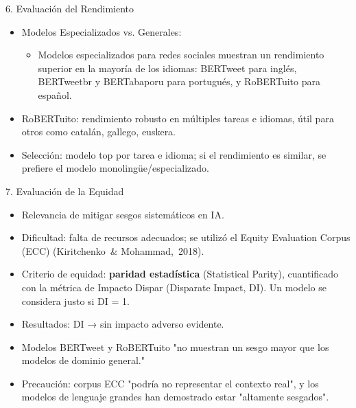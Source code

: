 \documentclass{beamer}
\begin{document}
\begin{frame}{6. Evaluación del Rendimiento}
  \begin{itemize}
    \item Modelos Especializados vs. Generales: 
    \begin{itemize} 
        \item Modelos especializados para redes sociales muestran un rendimiento superior en la mayoría de los idiomas: BERTweet para inglés, BERTweetbr y BERTabaporu para portugués, y RoBERTuito para español.
      \end{itemize}
    \item RoBERTuito: rendimiento robusto en múltiples tareas e idiomas, útil para otros como catalán, gallego, euskera.
    \item Selección: modelo top por tarea e idioma; si el rendimiento es similar, se prefiere el modelo monolingüe/especializado.
  \end{itemize}
\end{frame}

\begin{frame}{7. Evaluación de la Equidad}
  \begin{itemize}
    \item Relevancia de mitigar sesgos sistemáticos en IA.
    \item Dificultad: falta de recursos adecuados; se utilizó el Equity Evaluation Corpus (ECC) (Kiritchenko \& Mohammad, 2018).
    \item Criterio de equidad: \textbf{paridad estadística} (Statistical Parity), cuantificado con la métrica de Impacto Dispar (Disparate Impact, DI). Un modelo se considera justo si DI = 1.
    \item Resultados: DI  → sin impacto adverso evidente.
    \item Modelos BERTweet y RoBERTuito "no muestran un sesgo mayor que los modelos de dominio general."
    \item Precaución: corpus ECC "podría no representar el contexto real", y los modelos de lenguaje grandes han demostrado estar "altamente sesgados".
  \end{itemize}
\end{frame}
\end{document}
